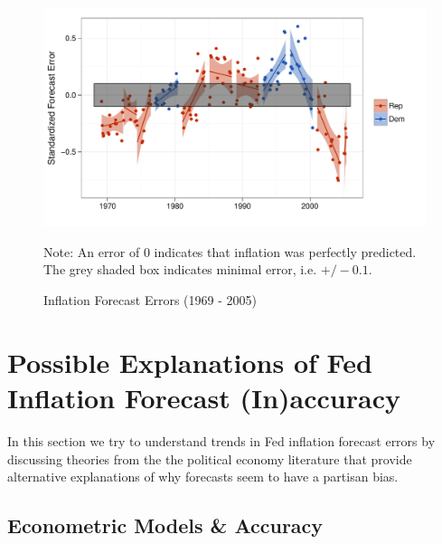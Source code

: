 \documentclass[a4paper]{article}\usepackage{graphicx, color}
\newenvironment{knitrout}{}{} %
\begin{document}
\begin{figure}[t]
    \caption{Inflation Forecast Errors (1969 - 2005)}
    \label{errors_over_time}
    \begin{center}
    
\begin{knitrout}
\color{fgcolor}\includegraphics[width=0.8\linewidth]{figure/PartisanError} 
\end{knitrout}

    
    \end{center}
    \begin{singlespace}
        {\scriptsize{Note: An error of 0 indicates that inflation was perfectly predicted. \\
            The grey shaded box indicates minimal error, i.e. $+/- 0.1$.
        }}
    \end{singlespace}
\end{figure}




\section{Possible Explanations of Fed Inflation Forecast (In)accuracy}

In this section we try to understand trends in Fed inflation forecast errors by discussing theories from the the political economy literature that provide alternative explanations of why forecasts seem to have a partisan bias. 

\subsection{Econometric Models \& Accuracy}
\end{document}
